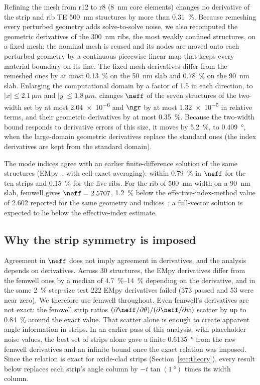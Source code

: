 Refining the mesh from r12 to r8 (\qty{8}{nm} core elements) changes no derivative of the strip and rib TE
\qty{500}{nm} structures by more than \qty{0.31}{\percent}. Because remeshing every perturbed geometry adds solve-to-solve
noise, we also recomputed the geometric derivatives of the \qty{300}{nm} ribs, the most weakly confined structures,
on a fixed mesh: the nominal mesh is reused and its nodes are moved onto each perturbed geometry by a continuous
piecewise-linear map that keeps every material boundary on its line. The fixed-mesh derivatives differ from the
remeshed ones by at most \qty{0.13}{\percent} on the \qty{50}{nm} slab and \qty{0.78}{\percent} on the \qty{90}{nm}
slab. Enlarging the computational domain by a factor of 1.5 in each direction, to
$|x|\le\qty{2.1}{\micro m}$ and $|y|\le\qty{1.8}{\micro m}$, changes $\neff$ of the seven structures of the two-width set by
at most \num{2.04e-6} and $\ngr$ by at most \num{1.32e-5} in relative terms, and their geometric derivatives by at most
\qty{0.35}{\percent}. Because the two-width bound responds to derivative errors of this size, it moves by
\qty{5.2}{\percent}, to \qty{0.409}{\degree}, when the large-domain geometric derivatives replace the standard ones (the
index derivatives are kept from the standard domain).

The mode indices agree with an earlier finite-difference solution of the same structures (EMpy~\cite{empy}, with
cell-exact averaging): within \qty{0.79}{\percent} in $\neff$ for the ten strips and \qty{0.15}{\percent} for the five ribs.
For the rib of \qty{500}{nm} width on a \qty{90}{nm} slab, femwell gives $\neff=2.5707$, \qty{1.2}{\percent} below the
effective-index-method value of 2.602 reported for the same geometry and indices~\cite{jiao2025}; a full-vector solution
is expected to lie below the effective-index estimate.

\subsection{Why the strip symmetry is imposed}

Agreement in $\neff$ does not imply agreement in derivatives, and the analysis depends on derivatives. Across 30
structures, the EMpy derivatives differ from the femwell ones by a median of \qtyrange{4.7}{14}{\percent} depending on the
derivative, and in the same \qty{2}{\percent} step-size test 222 EMpy derivatives failed (373 passed and 53 were near
zero). We therefore use
femwell throughout. Even femwell's derivatives are not exact: the femwell strip ratios
$(\partial\neff/\partial\theta)/(\partial\neff/\partial w)$ scatter by up to \qty{0.84}{\percent} around the exact
value. That scatter alone is enough to create apparent angle information in strips. In an earlier pass of this
analysis, with placeholder noise values, the best set of strips alone gave a finite \qty{0.6135}{\degree} from the raw
femwell derivatives and an infinite bound once the exact relation was imposed. Since the relation is exact for oxide-clad
strips (Section~\ref{sec:theory}), every result below replaces each strip's angle column by $-t\tan(\qty{1}{\degree})$
times its width column.

